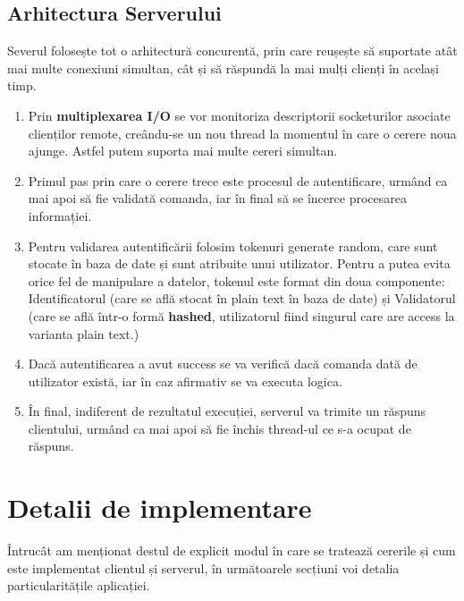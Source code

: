 \documentclass{article}
\begin{document}
\subsection{Arhitectura Serverului}
Severul folosește tot o arhitectură concurentă, prin care reușește să suportate atât mai multe conexiuni simultan, cât și să răspundă la mai mulți clienți în același timp.
\begin{enumerate}
    \item Prin \textbf{multiplexarea I/O} se vor monitoriza descriptorii socketurilor asociate clienților remote, creându-se un nou thread la momentul în care o cerere noua ajunge. Astfel putem suporta mai multe cereri simultan.
    \item Primul pas prin care o cerere trece este procesul de autentificare, urmând ca mai apoi să fie validată comanda, iar în final să se încerce procesarea informației. 
    \item Pentru validarea autentificării folosim tokenuri generate random, care sunt stocate în baza de date și sunt atribuite unui utilizator. Pentru a putea evita orice fel de manipulare a datelor, tokenul este format din doua componente: Identificatorul (care se află stocat în plain text în baza de date) și Validatorul (care se află într-o formă \textbf{hashed}, utilizatorul fiind singurul care are access la varianta plain text.)
    \item Dacă autentificarea a avut success se va verifică dacă comanda dată de utilizator există, iar în caz afirmativ se va executa logica. 
    \item În final, indiferent de rezultatul execuției, serverul va trimite un răspuns clientului, urmând ca mai apoi să fie închis thread-ul ce s-a ocupat de răspuns.
\end{enumerate}
\section{Detalii de implementare}
Întrucât am menționat destul de explicit modul în care se tratează cererile și cum este implementat clientul și serverul, în următoarele secțiuni voi detalia particularitățile aplicației.
\end{document}
